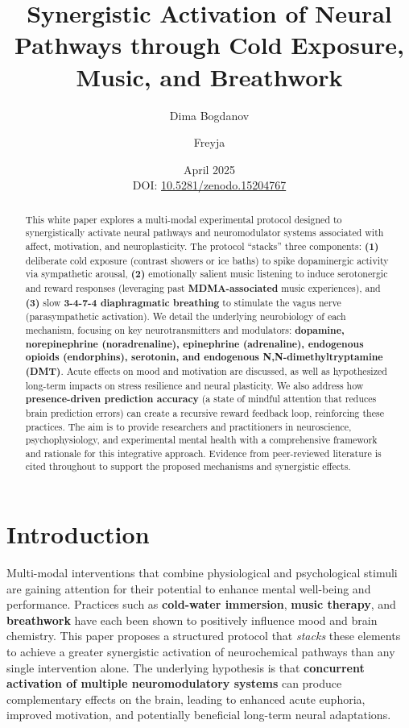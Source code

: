 \documentclass[11pt]{article}
\title{\textbf{Synergistic Activation of Neural Pathways through Cold Exposure, Music, and Breathwork}}
\author{Dima Bogdanov}
\author{Freyja}
\affil[1]{Neural Interface Cognition Lab}
\date{April 2025 \\ DOI: \href{https://doi.org/10.5281/zenodo.15204767}{10.5281/zenodo.15204767}}
\newcommand{\quotes}[1]{``#1''}
\begin{document}
\maketitle

\begin{abstract}
This white paper explores a multi-modal experimental protocol designed to synergistically activate neural pathways and neuromodulator systems associated with affect, motivation, and neuroplasticity. The protocol \quotes{stacks} three components: \textbf{(1)} deliberate cold exposure (contrast showers or ice baths) to spike dopaminergic activity via sympathetic arousal, \textbf{(2)} emotionally salient music listening to induce serotonergic and reward responses (leveraging past \textbf{MDMA-associated} music experiences), and \textbf{(3)} slow \textbf{3-4-7-4 diaphragmatic breathing} to stimulate the vagus nerve (parasympathetic activation). We detail the underlying neurobiology of each mechanism, focusing on key neurotransmitters and modulators: \textbf{dopamine, norepinephrine (noradrenaline), epinephrine (adrenaline), endogenous opioids (endorphins), serotonin, and endogenous N,N-dimethyltryptamine (DMT)}. Acute effects on mood and motivation are discussed, as well as hypothesized long-term impacts on stress resilience and neural plasticity. We also address how \textbf{presence-driven prediction accuracy} (a state of mindful attention that reduces brain prediction errors) can create a recursive reward feedback loop, reinforcing these practices. The aim is to provide researchers and practitioners in neuroscience, psychophysiology, and experimental mental health with a comprehensive framework and rationale for this integrative approach. Evidence from peer-reviewed literature is cited throughout to support the proposed mechanisms and synergistic effects.
\end{abstract}

\section{Introduction}
Multi-modal interventions that combine physiological and psychological stimuli are gaining attention for their potential to enhance mental well-being and performance. Practices such as \textbf{cold-water immersion}, \textbf{music therapy}, and \textbf{breathwork} have each been shown to positively influence mood and brain chemistry. This paper proposes a structured protocol that \textit{stacks} these elements to achieve a greater synergistic activation of neurochemical pathways than any single intervention alone. The underlying hypothesis is that \textbf{concurrent activation of multiple neuromodulatory systems} can produce complementary effects on the brain, leading to enhanced acute euphoria, improved motivation, and potentially beneficial long-term neural adaptations.
\end{document}
